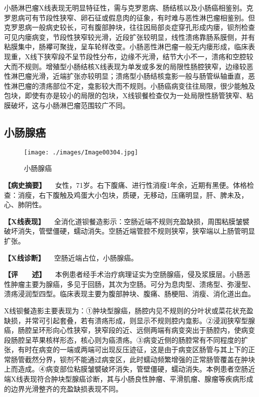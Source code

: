 小肠淋巴瘤X线表现无明显特征性，需与克罗恩病、肠结核以及小肠癌相鉴别。克罗恩病可有节段性狭窄、卵石征或假息肉的征象，有时难与恶性淋巴瘤相鉴别。但克罗恩病一般病史较长，可有腹部肿块，往往因局部炎症穿孔形成内瘘，钡剂检查可见内瘘病变，节段性狭窄较光滑，近段扩张较明显，线性溃疡靠肠系膜侧，并有粘膜集中，肠襻可聚拢，呈车轮样改变。小肠恶性淋巴瘤一般无内瘘形成，临床表现重，X线下狭窄段不呈节段性分布，边缘不光滑，结节大小不一，溃疡和空腔较大而不规则。增殖型小肠结核X线表现为单发或多发的局限性肠腔狭窄，边缘较恶性淋巴瘤光滑，近端扩张亦较明显；溃疡型小肠结核龛影一般与肠管纵轴垂直，恶性淋巴瘤的溃疡部位不定，龛影较大而不规则。小肠癌病变往往局限，很少能触及包块，即使有亦是较小的局限的包块，X线钡餐检查仅为一处局限性肠管狭窄、粘膜破坏，这与小肠淋巴瘤范围较广不同。

\subsection{小肠腺癌}

\begin{figure}[!htbp]
 \centering
 \texttt{[image: ./images/Image00304.jpg]}
 \captionsetup{justification=centering}
 \caption{小肠腺癌}
 \label{fig5-5-8}
  \end{figure} 

\textbf{【病史摘要】}
　女性，71岁。右下腹痛、进行性消瘦1年余，近期有黑便。体格检查：消瘦，右下腹触及鸡蛋大小包块，质硬，无移动，压痛明显，肝、脾未及，心、肺阴性。

\textbf{【X线表现】}
　全消化道钡餐造影示：空肠近端不规则充盈缺损，周围粘膜皱襞破坏消失，管壁僵硬，蠕动消失。空肠近端管腔不规则狭窄，狭窄端以上肠管明显扩张。

\textbf{【X线诊断】} 　空肠近端占位，小肠腺癌。

\textbf{【评　　述】}
　本例患者经手术治疗病理证实为空肠腺癌，侵及浆膜层。小肠恶性肿瘤主要为腺癌，多见于回肠，其次为空肠。可分为息肉型、溃疡型、弥漫型、溃疡浸润型四型。临床表现主要为腹部肿块、腹痛、肠梗阻、消瘦、消化道出血。

X线钡餐造影主要表现为：①肿块型腺癌，肠腔内见不规则的分叶状或菜花状充盈缺损，并常可引起套叠，若有溃疡形成，则显示不规则腔内龛影。②浸润狭窄型腺癌，肠腔呈环形向心性狭窄，狭窄段的近、远侧两端有病变突出于肠腔内，使病变段肠腔呈苹果核样形态，核心则为癌溃疡。③病变近侧的肠腔常有不同程度的扩张，有时在病变的一端或两端可出现反压迹征，这是由于病变区肠管与其上下的正常肠管截然分界，钡剂不能通过病变区，此时蠕动频繁增强的正常肠管覆盖在肿块上而造成。④病变部位粘膜皱襞破坏消失，管壁僵硬，蠕动消失。本例患者空肠近端X线表现符合肿块型腺癌诊断，其与小肠良性肿瘤、平滑肌瘤、腺瘤等疾病形成的边界光滑整齐的充盈缺损表现不同。

